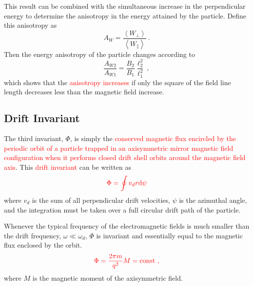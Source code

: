 \documentclass[12pt,a4paper]{article}
\newcommand{\dif}{\mathrm{d}}
\begin{document}
This result can be combined with the simultaneous increase in the perpendicular energy to determine the anisotropy in the energy attained by the particle. Define this anisotropy as
\begin{equation}
A_W = \dfrac{\left\langle W_\perp \right\rangle}{\left\langle W_\parallel \right\rangle}  ~.
\end{equation}
Then the energy anisotropy of the particle changes according to
\begin{equation}
\dfrac{A_{W2} }{A_{W1}} = \dfrac{B_{2} }{B_{1}} \dfrac{\ell^2_{2} }{\ell^2_{1}} ~,
\end{equation}
which shows that the \textcolor{red}{anisotropy increases} if only the square of the field line length decreases less than the magnetic field increase.













\subsection{Drift Invariant}
\cite{1996bspp.book.....B} The third invariant, $\Phi$, is simply the \textcolor{red}{conserved magnetic flux encircled by the periodic orbit of a particle trapped in an axisymmetric mirror magnetic field configuration when it performs closed drift shell orbits around the magnetic field axis}. This \textcolor{red}{drift invariant} can be written as
\begin{equation}
\color{red} \Phi = \oint v_d r \dif \psi
\end{equation}
where $v_d$ is the sum of all perpendicular drift velocities, $\psi$ is the azimuthal angle, and the integration must be taken over a full circular drift path of the particle.

Whenever the typical frequency of the electromagnetic fields is much smaller than the drift frequency, $\omega \ll \omega_d$, $\Phi$ is invariant and essentially equal to the magnetic flux enclosed by the orbit.
\begin{equation}
\color{red} \Phi = \dfrac{2\pi m}{q^2} M = \rm const ~,
\end{equation}
where $M$ is the magnetic moment of the axisymmetric field.
\end{document}
